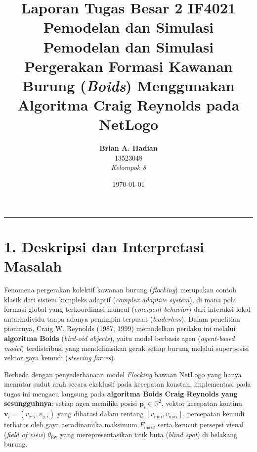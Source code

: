 \documentclass[11pt,a4paper]{article}
\title{
    \textbf{Laporan Tugas Besar 2 IF4021 Pemodelan dan Simulasi} \\
    \vspace{0.2cm}
    \large Pemodelan dan Simulasi Pergerakan Formasi Kawanan Burung (\textit{Boids}) Menggunakan Algoritma Craig Reynolds pada NetLogo
}
\author{
    \textbf{Brian A. Hadian} \\ 13523048 \\
    \textit{Kelompok 8}
    \makeatother
}
\date{\today}
\begin{document}
\maketitle

\hrule
\vspace{0.5cm}

\section*{1. Deskripsi dan Interpretasi Masalah}

Fenomena pergerakan kolektif kawanan burung (\textit{flocking}) merupakan contoh klasik dari sistem kompleks adaptif (\textit{complex adaptive system}), di mana pola formasi global yang terkoordinasi muncul (\textit{emergent behavior}) dari interaksi lokal antarindividu tanpa adanya pemimpin terpusat (\textit{leaderless}). Dalam penelitian pionirnya, Craig W. Reynolds (1987, 1999) memodelkan perilaku ini melalui \textbf{algoritma Boids} (\textit{bird-oid objects}), yaitu model berbasis agen (\textit{agent-based model}) terdistribusi yang mendefinisikan gerak setiap burung melalui superposisi vektor gaya kemudi (\textit{steering forces}).

Berbeda dengan penyederhanaan model \textit{Flocking} bawaan NetLogo yang hanya memutar sudut arah secara eksklusif pada kecepatan konstan, implementasi pada tugas ini mengacu langsung pada \textbf{algoritma Boids Craig Reynolds yang sesungguhnya}: setiap agen memiliki posisi $\mathbf{p}_i \in \mathbb{R}^2$, vektor kecepatan kontinu $\mathbf{v}_i = (v_{x,i}, v_{y,i})$ yang dibatasi dalam rentang $[v_{\min}, v_{\max}]$, percepatan kemudi terbatas oleh gaya aerodinamika maksimum $F_{\max}$, serta kerucut persepsi visual (\textit{field of view}) $\theta_{\text{fov}}$ yang merepresentasikan titik buta (\textit{blind spot}) di belakang burung.
\end{document}

